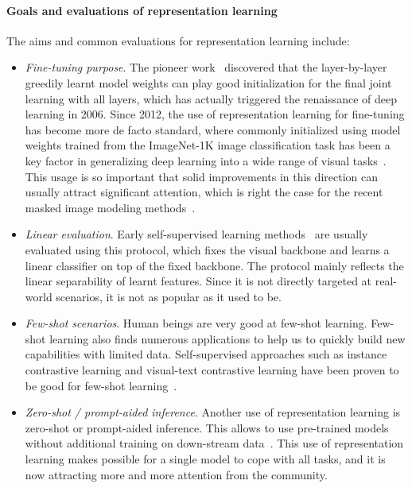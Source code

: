 \documentclass{article}
\begin{document}
\paragraph{Goals and evaluations of representation learning} The aims and common evaluations for representation learning include:
\begin{itemize}
\item \emph{Fine-tuning purpose}. The pioneer work~\cite{HinSal06} discovered that the layer-by-layer greedily learnt model weights can play good initialization for the final joint learning with all layers, which has actually triggered the renaissance of deep learning in 2006. Since 2012, the use of representation learning for fine-tuning has become more de facto standard, where commonly initialized using model weights trained from the ImageNet-1K image classification task has been a key factor in generalizing deep learning into a wide range of visual tasks~\cite{rcnn13,long2015fully}. This usage is so important that solid improvements in this direction can usually attract significant attention, which is right the case for the recent masked image modeling methods~\cite{bao2021beit, MaskedAutoencoders2021, xie2021simmim}. 


\item \emph{Linear evaluation}. Early self-supervised learning methods~\cite{dosovitskiy2014exemplarcnn, pathak2016context, he2019moco} are usually evaluated using this protocol, which fixes the visual backbone and learns a linear classifier on top of the fixed backbone. The protocol mainly reflects the linear separability of learnt features. Since it is not directly targeted at real-world scenarios, it is not as popular as it used to be. 

\item \emph{Few-shot scenarios}. 
Human beings are very good at few-shot learning. Few-shot learning also finds numerous applications to help us to quickly build new capabilities with limited data. Self-supervised approaches such as instance contrastive learning and visual-text contrastive learning have been proven to be good for few-shot learning~\cite{wu2018memorybank,chen2020big,radford2021clip}.

\item \emph{Zero-shot / prompt-aided inference}. Another use of representation learning is zero-shot or prompt-aided inference. This allows to use pre-trained models without additional training on down-stream data~\cite{radford2021clip,gu2021open,xu2021simple}. This use of representation learning makes possible for a single model to cope with all tasks, and it is now attracting more and more attention from the community. 

\end{itemize}
\end{document}
